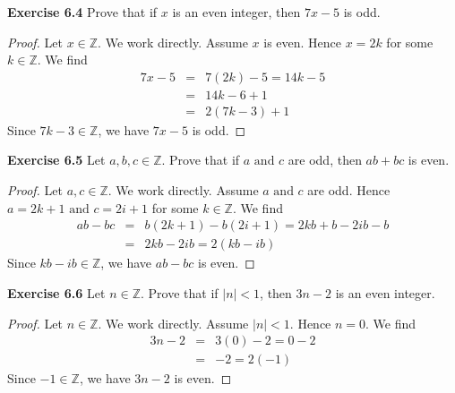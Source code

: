 \documentclass[12pt,oneside]{article}
\newenvironment{exercise}[1]{\vspace{.1in}\noindent\textbf{Exercise #1 \hspace{.05em}}}{}
\newcommand{\Z}{\mathbb{Z}}
\begin{document}

\begin{exercise}{6.4}
Prove that if $x$ is an even integer, then $7x - 5$ is odd.
\end{exercise}

\begin{proof}
Let $x \in \Z$. We work directly. Assume $x$ is even. Hence $x = 2k$ for some $k \in \Z$. We find
\begin{eqnarray*}
7x - 5  &=& 7(2k) - 5 = 14k - 5 \\
&=& 14k - 6 + 1 \\ 
&=& 2(7k - 3) + 1 
\end{eqnarray*}
Since $7k - 3 \in \Z$, we have $7x - 5$ is odd.
\end{proof}

\newpage


\begin{exercise}{6.5}
Let $a,b,c \in \Z$. Prove that if $a \text{ and } c$ are odd, then $ab + bc$ is even.
\end{exercise}

\begin{proof}
Let $a,c \in \Z$. We work directly. Assume $a \text{ and } c$ are odd. Hence $a = 2k + 1 \text{ and } c = 2i + 1$ for some $k \in \Z$. We find
\begin{eqnarray*}
ab - bc  &=& b(2k + 1) - b(2i + 1) = 2kb + b - 2ib - b \\
&=& 2kb - 2ib = 2(kb - ib)
\end{eqnarray*}
Since $kb - ib \in \Z$, we have $ab - bc$ is even.
\end{proof}


\begin{exercise}{6.6}
Let $n \in \Z$. Prove that if $|n| < 1$, then $3n - 2$ is an even integer.
\end{exercise}

\begin{proof}
Let $n \in \Z$. We work directly. Assume $|n| < 1$. Hence $n = 0$. We find
\begin{eqnarray*}
3n - 2 &=& 3(0) - 2 = 0 - 2 \\
&=& - 2 = 2(-1)
\end{eqnarray*}
Since $-1 \in \Z$, we have $3n - 2$ is even.
\end{proof}
\end{document}
